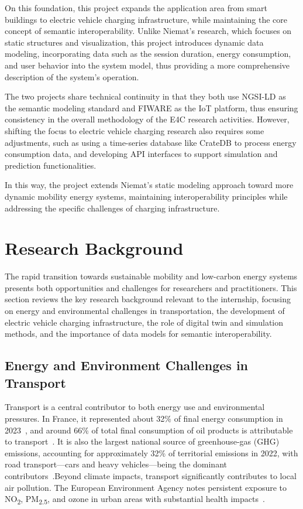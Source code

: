 On this foundation, this project expands the application area from smart buildings to electric vehicle charging infrastructure, while maintaining the core concept of semantic interoperability. Unlike Niemat's research, which focuses on static structures and visualization, this project introduces dynamic data modeling, incorporating data such as the session duration, energy consumption, and user behavior into the system model, thus providing a more comprehensive description of the system's operation.

The two projects share technical continuity in that they both use NGSI-LD as the semantic modeling standard and FIWARE as the IoT platform, thus ensuring consistency in the overall methodology of the E4C research activities. However, shifting the focus to electric vehicle charging research also requires some adjustments, such as using a time-series database like CrateDB to process energy consumption data, and developing API interfaces to support simulation and prediction functionalities. 

In this way, the project extends Niemat's static modeling approach toward more dynamic mobility 
energy systems, maintaining interoperability principles while addressing the specific challenges of 
charging infrastructure.

\section{Research Background}
The rapid transition towards sustainable mobility and low-carbon energy systems presents both opportunities and challenges for researchers and practitioners. This section reviews the key research background relevant to the internship, focusing on energy and environmental challenges in transportation, the development of electric vehicle charging infrastructure, the role of digital twin and simulation methods, and the importance of data models for semantic interoperability.

\subsection{Energy and Environment Challenges in Transport}

Transport is a central contributor to both energy use and environmental pressures. In France, it represented about 32\% of final energy consumption in 2023~\cite{IEA2025_FranceEnergy}, and around 66\% of total final consumption of oil products is attributable to transport~\cite{IEA2025_FranceOil}. It is also the largest national source of greenhouse-gas (GHG) emissions, accounting for approximately 32\% of territorial emissions in 2022, with road transport—cars and heavy vehicles—being the dominant contributors~\cite{HCC2023_GHG}.Beyond climate impacts, transport significantly contributes to local air pollution. The European Environment Agency notes persistent exposure to NO\textsubscript{2}, PM\textsubscript{2.5}, and ozone in urban areas with substantial health impacts~\cite{EEA2024_AirPollution}. 

